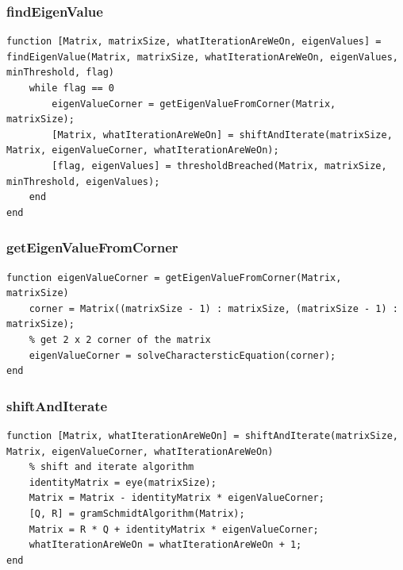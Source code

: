 \subsubsection{findEigenValue}
\begin{simplechar}
\begin{lstlisting}
function [Matrix, matrixSize, whatIterationAreWeOn, eigenValues] = findEigenValue(Matrix, matrixSize, whatIterationAreWeOn, eigenValues, minThreshold, flag)
    while flag == 0
        eigenValueCorner = getEigenValueFromCorner(Matrix, matrixSize);
        [Matrix, whatIterationAreWeOn] = shiftAndIterate(matrixSize, Matrix, eigenValueCorner, whatIterationAreWeOn);
        [flag, eigenValues] = thresholdBreached(Matrix, matrixSize, minThreshold, eigenValues);
    end
end

\end{lstlisting}
\end{simplechar}

\newpage
\subsubsection{getEigenValueFromCorner}
\begin{simplechar}
\begin{lstlisting}
function eigenValueCorner = getEigenValueFromCorner(Matrix, matrixSize)
    corner = Matrix((matrixSize - 1) : matrixSize, (matrixSize - 1) : matrixSize);
    % get 2 x 2 corner of the matrix
    eigenValueCorner = solveCharactersticEquation(corner);
end

\end{lstlisting}
\end{simplechar}

\subsubsection{shiftAndIterate}
\begin{simplechar}
\begin{lstlisting}
function [Matrix, whatIterationAreWeOn] = shiftAndIterate(matrixSize, Matrix, eigenValueCorner, whatIterationAreWeOn)
    % shift and iterate algorithm
    identityMatrix = eye(matrixSize);
    Matrix = Matrix - identityMatrix * eigenValueCorner;
    [Q, R] = gramSchmidtAlgorithm(Matrix);
    Matrix = R * Q + identityMatrix * eigenValueCorner;
    whatIterationAreWeOn = whatIterationAreWeOn + 1;
end

\end{lstlisting}
\end{simplechar}

